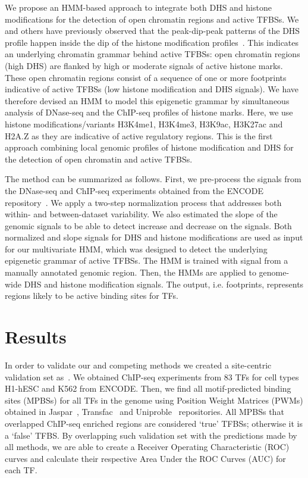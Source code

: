 \documentclass{AbstractTemplate}
\begin{document}
We propose an HMM-based approach to integrate both DHS and histone modifications for the detection of open chromatin regions and active TFBSs. We and others have previously observed that the peak-dip-peak patterns of the DHS profile happen inside the dip of the histone modification profiles~\cite{gusmao2012,neph2012a,kundaje2012}. This indicates an underlying chromatin grammar behind active TFBSs: open chromatin regions (high DHS) are flanked by high or moderate signals of active histone marks. These open chromatin regions consist of a sequence of one or more footprints indicative of active TFBSs (low histone modification and DHS signals). We have therefore devised an HMM to model this epigenetic grammar by simultaneous analysis of DNase-seq and the ChIP-seq profiles of histone marks. Here, we use histone modifications/variants H3K4me1, H3K4me3, H3K9ac, H3K27ac and H2A.Z as they are indicative of active regulatory regions. This is the first approach combining local genomic profiles of histone modification and DHS for the detection of open chromatin and active TFBSs.

The method can be summarized as follows. First, we pre-process the signals from the DNase-seq and ChIP-seq experiments obtained from the ENCODE repository~\cite{encode2012}. We apply a two-step normalization process that addresses both within- and between-dataset variability. We also estimated the slope of the genomic signals to be able to detect increase and decrease on the signals. Both normalized and slope signals for DHS and histone modifications are used as input for our multivariate HMM, which was designed to detect the underlying epigenetic grammar of active TFBSs. The HMM is trained with signal from a manually annotated genomic region. Then, the HMMs are applied to genome-wide DHS and histone modification signals. The output, i.e. footprints, represents regions likely to be active binding sites for TFs.

\section{Results}
\label{sec:results}

In order to validate our and competing methods we created a site-centric validation set as~\cite{cuellar2012}. We obtained ChIP-seq experiments from 83 TFs for cell types H1-hESC and K562 from ENCODE. Then, we find all motif-predicted binding sites (MPBSs) for all TFs in the genome using Position Weight Matrices (PWMs) obtained in Jaspar~\cite{mathelier2014}, Transfac~\cite{matys2006} and Uniproble~\cite{robasky2011} repositories. All MPBSs that overlapped ChIP-seq enriched regions are considered `true' TFBSs; otherwise it is a `false' TFBS. By overlapping such validation set with the predictions made by all methods, we are able to create a Receiver Operating Characteristic (ROC) curves and calculate their respective Area Under the ROC Curves (AUC) for each TF.
\end{document}

